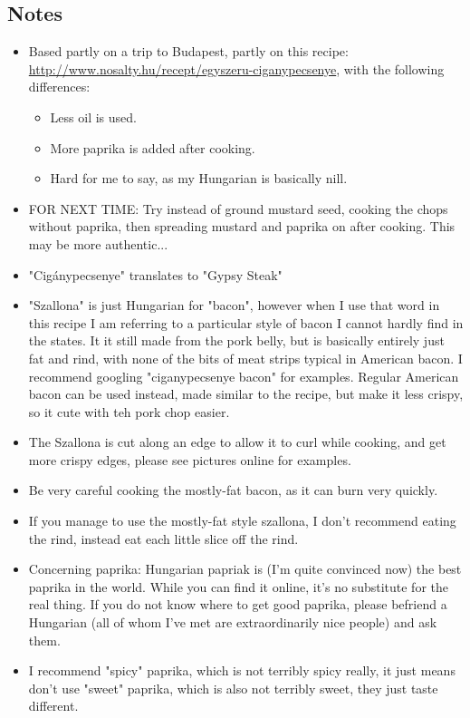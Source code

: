 \begin{multicols}{2}
\subsection*{Notes}
\begin{itemize}
    \item Based partly on a trip to Budapest, partly on this recipe: \url{http://www.nosalty.hu/recept/egyszeru-ciganypecsenye}, with the following differences:
    \begin{itemize}
        \item Less oil is used.
        \item More paprika is added after cooking.
        \item Hard for me to say, as my Hungarian is basically nill.
    \end{itemize}
    \item FOR NEXT TIME: Try instead of ground mustard seed, cooking the chops without paprika, then spreading mustard and paprika on after cooking. This may be more authentic...
    \item "Cigánypecsenye" translates to "Gypsy Steak"
    \item "Szallona" is just Hungarian for "bacon", however when I use that word in this recipe I am referring to a particular style of bacon I cannot hardly find in the states. It it still made from the pork belly, but is basically entirely just fat and rind, with none of the bits of meat strips typical in American bacon. I recommend googling "ciganypecsenye bacon" for examples. Regular American bacon can be used instead, made similar to the  recipe, but make it less crispy, so it cute with teh pork chop easier.
    \item The Szallona is cut along an edge to allow it to curl while cooking, and get more crispy edges, please see pictures online for examples.
    \item Be very careful cooking the mostly-fat bacon, as it can burn very quickly.
    \item If you manage to use the mostly-fat style szallona, I don't recommend eating the rind, instead eat each little slice off the rind.
    \item Concerning paprika: Hungarian papriak is (I'm quite convinced now) the best paprika in the world. While you can find it online, it's no substitute for the real thing. If you do not know where to get good paprika, please befriend a Hungarian (all of whom I've met are extraordinarily nice people) and ask them.
    \item I recommend "spicy" paprika, which is not terribly spicy really, it just means don't use "sweet" paprika, which is also not terribly sweet, they just taste different.

\end{itemize}
\end{multicols}
\clearpage